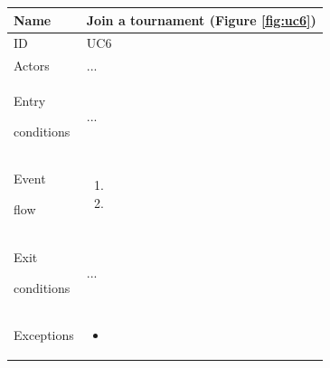 \begin{center}
    \def\arraystretch{1.5}
    \begin{tabular}{| m{2cm} | m{10cm}|}
        \hline
        Name                  & Join a tournament  (Figure \ref{fig:uc6})                                                                                                               \\ \hline
        ID                    & UC6                                                                                                                             \\ \hline
        Actors                & ... \\ \hline
        Entry \par conditions & ... \\ \hline
        Event \par flow       & \begin{enumerate}
                                    \item 
                                    \item 
                                \end{enumerate} \\ \hline
        Exit \par conditions  & ... \\ \hline
        Exceptions            & \begin{itemize}
                                    \item 
                                \end{itemize} \\ \hline
    \end{tabular}
\end{center}

